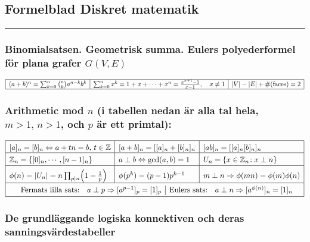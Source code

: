\documentclass{article}
\let\ergo\Longrightarrow
\newcommand\binom[2]{{#1\choose #2}}
\def\Zone{{\mathbb Z}}
\let\iff\Leftrightarrow
\let\ergo\Rightarrow
\begin{document}
\subsection*{Formelblad Diskret matematik}
\hrule
\bigskip

\subsubsection*{Binomialsatsen. Geometrisk summa. Eulers polyederformel för plana grafer $G(V,E)$} %
\vspace{-2em}
\[
  \begin{array}[t]{|l|l|l|}
\hline
  (a+b)^n = \sum_{k=0}^{n} \binom{n}{k} a^{n-k}b^k &
  \sum_{k=0}^{n} x^k = 1 + x  + \cdots +x^n = \frac{x^{n+1}-1}{x-1},\quad x \neq 1 &
  |V|-|E|+ \#(\mbox{faces}) = 2
\\\hline
  \end{array}
\]%

\subsubsection*{Arithmetic mod $n$ %
\textnormal{(i tabellen nedan är alla tal hela, $m>1,\,n>1$, och $p$ är ett primtal):}}
\vspace{-2.2em}
\[
  \begin{array}[t]{|*{4}{l|}}
    \hline \rule{0pt}{12pt}
      [a]_n=[b]_n\iff a+tn = b,\, t\in \Zone
    & [a+b]_n = [[a]_n + [b]_n]_n
    & [ab]_n = [[a]_n[b]_n]_n
    \cr\hline \rule{0pt}{12pt}
      \Zone_n=\{[0]_n,\cdots,[n-1]_n\}
    & a\perp b \iff \gcd(a,b)=1
    & U_n=\{x\in\Zone_n\!: x\perp n\} %
    \\[1pt] \hline
      \rule{0pt}{16pt}
      \phi(n) =  |U_n| = n\prod_{p|n}\Bigl(1-\frac1p\Bigr)
      & \phi(p^k) = (p-1)p^{k-1}
    & m\perp n\ergo \phi(mn)=\phi(m)\phi(n)
    \\ \hline
    \multicolumn{3}{|l|}{\rule{0pt}{12pt}
      \begin{array}[m]{l rl|rl}
        &\mbox{Fermats lilla sats:} & a\perp p\ergo [a^{p-1}]_p=[1]_p
        &\mbox{Eulers sats:}        & a\perp n\ergo [a^{\phi(n)}]_n=[1]_n
      \end{array}
    }
    \\[2pt] \hline
  \end{array}
\]%

\subsubsection*{De grundläggande logiska konnektiven och deras sanningsvärdestabeller}%
\end{document}
